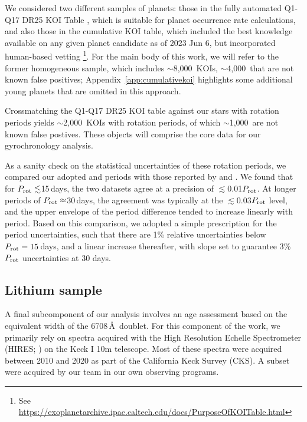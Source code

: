 \documentclass[11pt,twocolumn,tighten]{aastex63}
\newcommand{\nkois}{{$\sim$8{,}000}} %
\newcommand{\nkoisnofp}{{$\sim$4{,}000}} %
\newcommand{\nkoiswithprot}{{$\sim$2{,}000}}
\newcommand{\nkoisnofpwithprot}{{$\sim$1{,}000}}
\begin{document}
We considered two different samples of planets: those in the fully
automated Q1-Q17 DR25 KOI Table \citep{Thompson_2018}, which is
suitable for planet occurrence rate calculations, and also those in
the cumulative KOI table, which included the best knowledge available
on any given planet candidate as of 2023 Jun 6, but incorporated
human-based vetting \footnote{See
\url{https://exoplanetarchive.ipac.caltech.edu/docs/PurposeOfKOITable.html}}.
For the main body of this work, we will refer to the former
homogeneous sample, which includes \nkois\ KOIs, \nkoisnofp\ that are
not known false positives; Appendix~\ref{app:cumulativekoi} highlights
some additional young planets that are omitted in this approach.

Crossmatching the Q1-Q17 DR25 KOI table against our stars with
rotation periods yields \nkoiswithprot\ KOIs with rotation periods, of
which \nkoisnofpwithprot\ are not known false postives.  These objects
will comprise the core data for our gyrochronology analysis.

As a sanity check on the statistical uncertainties of these rotation
periods, we compared our adopted  and
 periods with those reported by
\citet{McQuillan_2014} and \citet{Mazeh_2015}.  We found that for
$P_{\rm rot}\lesssim$15\,days, the two datasets agree at a precision
of $\lesssim$0.01$P_{\rm rot}$.  At longer periods of $P_{\rm
rot}\approx$30\,days, the agreement was typically at the
$\lesssim$0.03$P_{\rm rot}$ level, and the upper envelope of the
period difference tended to increase linearly with period.  Based on
this comparison, we adopted a simple prescription for the period
uncertainties, such that there are 1\% relative uncertainties below
$P_{\rm rot}=15$\,days, and a linear increase thereafter, with slope
set to guarantee 3\% $P_{\rm rot}$ uncertainties at 30 days.



\subsection{Lithium sample}
A final subcomponent of our analysis involves an age assessment based on
the equivalent width of the  6708\,\AA\ doublet.  For this
component of the work, we primarily rely on spectra acquired with the
High Resolution Echelle Spectrometer (HIRES;
\citealt{vogt_hires_1994}) on the Keck I 10m telescope.
Most of these spectra were acquired between 2010 and 2020
as part of the California Keck Survey (CKS).
A subset were acquired by our team in our own observing programs.
\end{document}
